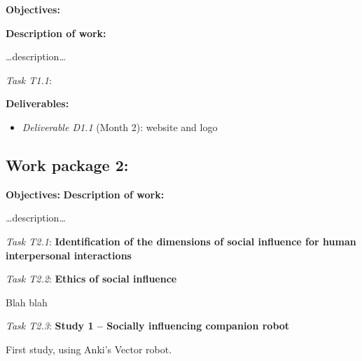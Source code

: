 \documentclass[11pt]{report}
\newcommand{\task}[2]{\vspace{0.5cm}\noindent\emph{Task T#1}: {\bf #2}\par}
\begin{document}


\textbf{Objectives:}

\textbf{Description of work:}

\ldots{}description\ldots{}

\task{1.1}{}

\vspace{0.5cm}\textbf{Deliverables:}

\begin{itemize}

\item   \emph{Deliverable D1.1} (Month 2): website and logo
\end{itemize}

\subsection{Work package 2: \wpTwo}

\textbf{Objectives:}
\textbf{Description of work:}

\ldots{}description\ldots{}

\task{2.1}{Identification of the dimensions of social influence for human interpersonal interactions}

\task{2.2}{Ethics of social influence}
Blah blah

\task{2.3}{Study 1 -- Socially influencing companion robot}
First study, using Anki's Vector robot.
\end{document}
